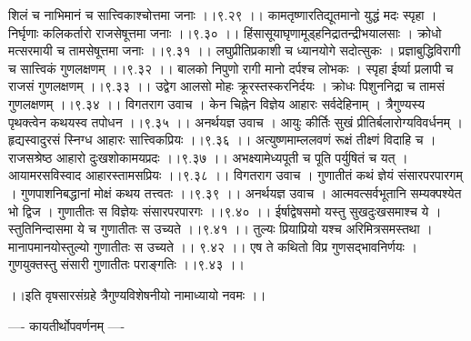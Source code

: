 \documentclass[11pt]{book}
\begin{document}
\begin{landscape}
शिलं च नाभिमानं च सात्त्विकाश्चोत्तमा जनाः ।।९.२९ ।।
कामतृष्णारतिद्यूतमानो युद्धं मदः स्पृहा ।
निर्घृणाः कलिकर्तारो राजसेषूत्तमा जनाः ।।९.३० ।।
हिंसासूयाघृणामूड्हनिद्रातन्द्रीभयालसाः ।
क्रोधो मत्सरमायी च तामसेषूत्तमा जनाः ।।९.३१ ।।
लघुप्रीतिप्रकाशी च ध्यानयोगे सदोत्सुकः ।
प्रज्ञाबुद्धिविरागी च सात्त्विकं गुणलक्षणम् ।।९.३२ ।।
बालको निपुणो रागी मानो दर्पश्च लोभकः ।
स्पृहा ईर्ष्या प्रलापी च राजसं गुणलक्षणम् ।।९.३३ ।।
उद्वेग आलसो मोहः क्रूरस्तस्करनिर्दयः ।
क्रोधः पिशुननिद्रा च तामसं गुणलक्षणम् ।।९.३४ ।।
विगतराग उवाच ।
केन चिह्नेन विज्ञेय आहारः सर्वदेहिनाम् ।
त्रैगुण्यस्य पृथक्त्वेन कथयस्व तपोधन ।।९.३५ ।।
अनर्थयज्ञ उवाच ।
आयुः कीर्तिः सुखं प्रीतिर्बलारोग्यविवर्धनम् ।
हृद्यस्वादुरसं स्निग्ध आहारः सात्त्विकप्रियः ।।९.३६ ।।
अत्युष्णमाम्ललवणं रूक्षं तीक्ष्णं विदाहि च ।
राजसश्रेष्ठ आहारो दुःखशोकामयप्रदः ।।९.३७ ।।
अभक्ष्यामेध्यपूती च पूति पर्युषितं च यत् ।
आयामरसविस्वाद आहारस्तामसप्रियः ।।९.३८ ।।
विगतराग उवाच ।
गुणातीतं कथं ज्ञेयं संसारपरपारगम् ।
गुणपाशनिबद्धानां मोक्षं कथय तत्त्वतः ।।९.३९ ।।
अनर्थयज्ञ उवाच ।
आत्मवत्सर्वभूतानि सम्यक्पश्येत भो द्विज ।
गुणातीतः स विज्ञेयः संसारपरपारगः ।।९.४० ।।
ईर्षाद्वेषसमो यस्तु सुखदुःखसमाश्च ये ।
स्तुतिनिन्दासमा ये च गुणातीतः स उच्यते ।।९.४१ ।।
तुल्यः प्रियाप्रियो यश्च अरिमित्रसमस्तथा ।
मानापमानयोस्तुल्यो गुणातीतः स उच्यते ।। ९.४२ ।।
एष ते कथितो विप्र गुणसद्भावनिर्णयः ।
गुणयुक्तस्तु संसारी गुणातीतः पराङ्गतिः ।।९.४३ ।।

 ।।इति वृषसारसंग्रहे त्रैगुण्यविशेषनीयो नामाध्यायो नवमः ।।





---- कायतीर्थोपवर्णनम् ----


\end{landscape}
\end{document}
